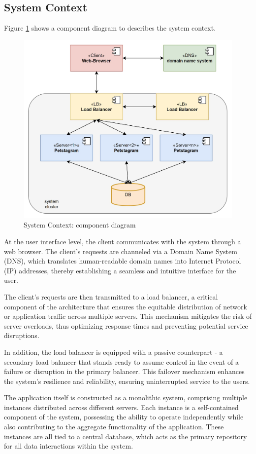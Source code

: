 \documentclass[lettersize,journal]{IEEEtran}
\begin{document}
\subsection{System Context}

\noindent Figure \ref{fig:system-context_Component-Diagram} shows a component diagram to describes the system context. 

\begin{figure}[!t]
    \centering
    \includegraphics[width=3.5 in]{diagrams/system-context_Component-Diagram}
    \caption{System Context: component diagram}
    \label{fig:system-context_Component-Diagram}
\end{figure}

At the user interface level, the client communicates with the system through a web browser. The client's requests are channeled via a Domain Name System (DNS), which translates human-readable domain names into Internet Protocol (IP) addresses, thereby establishing a seamless and intuitive interface for the user.

The client's requests are then transmitted to a load balancer, a critical component of the architecture that ensures the equitable distribution of network or application traffic across multiple servers. This mechanism mitigates the risk of server overloads, thus optimizing response times and preventing potential service disruptions.

In addition, the load balancer is equipped with a passive counterpart - a secondary load balancer that stands ready to assume control in the event of a failure or disruption in the primary balancer. This failover mechanism enhances the system's resilience and reliability, ensuring uninterrupted service to the users.

The application itself is constructed as a monolithic system, comprising multiple instances distributed across different servers. Each instance is a self-contained component of the system, possessing the ability to operate independently while also contributing to the aggregate functionality of the application.
These instances are all tied to a central database, which acts as the primary repository for all data interactions within the system. 
\end{document}
